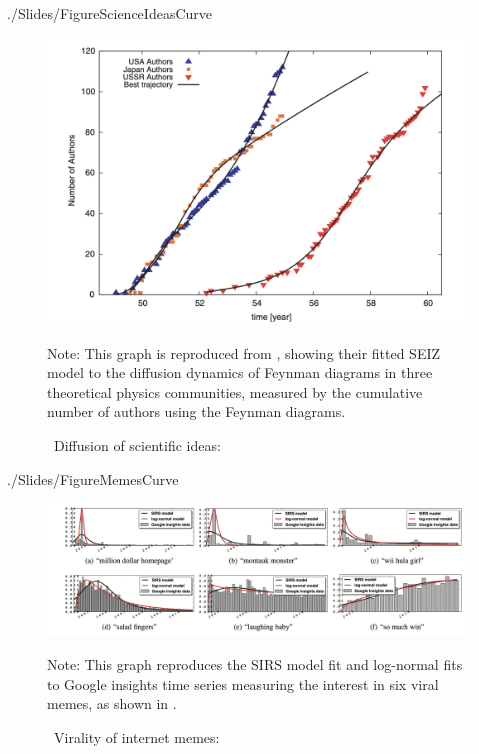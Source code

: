 \newpage


\begin{verbatimwrite}{./Slides/FigureScienceIdeasCurve}
\begin{figure}[!ht] \centering  %
	\caption{ ~Diffusion of scientific ideas: \href{http://web.mit.edu/dikaiser/www/BAKC.PhysA.pdf}{\cite{bettencourt2006power}}}
	\label{fig:science_ideas_curve}
	\centerline{\includegraphics[width=\textwidth]{./figures/Feynman.png}}
		\begin{flushleft}{\footnotesize Note: This graph is reproduced from \cite{bettencourt2006power}, showing their fitted SEIZ model to the diffusion dynamics of Feynman diagrams in three theoretical physics communities, measured by the cumulative number of authors using the Feynman diagrams.}
	\end{flushleft}
\end{figure}
\end{verbatimwrite}%


\newpage

\begin{verbatimwrite}{./Slides/FigureMemesCurve}
\begin{figure}[!ht] \centering  %
	\caption{ ~Virality of internet memes: \href{https://github.com/iworld1991/EpiExp/blob/master/Literature/bauckhage2011insights.pdf}{\cite{bauckhage2011insights}}}
	\label{fig:memes_curve}
	\centerline{\includegraphics[width=\textwidth]{./figures/Memes.png}}
	\begin{flushleft}{\footnotesize Note: This graph reproduces the SIRS model fit and log-normal fits to Google insights time series measuring the interest in six viral memes, as shown in  \cite{bauckhage2011insights}. }
\end{flushleft}
\end{figure}
\end{verbatimwrite}%
